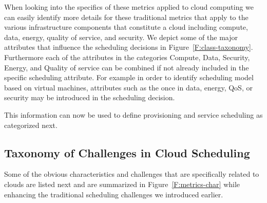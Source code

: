 \documentclass[final,5p,times,twocolumn]{elsarticle}
\begin{document}
% 

When looking into the specifics of these metrics applied to cloud
computing we can easily identify more details for these traditional
metrics that apply to the various infrastructure components that
constitute a cloud including compute, data, energy, quality of
service, and security. We depict some of the major attributes that
influence the scheduling decisions in Figure~\ref{F:class-taxonomy}.
Furthermore each of the attributes in the categories Compute, Data,
Security, Energy, and Quality of service can be combined if not
already included in the specific scheduling attribute. For example in
order to identify scheduling model based on virtual machines,
attributes such as the once in data, energy, QoS, or security may be
introduced in the scheduling decision.



This information can now be used to define provisioning and service
scheduling as categorized next.

\subsection{Taxonomy of Challenges in Cloud Scheduling}\label{sec:challange}

Some of the obvious characteristics and challenges that are
specifically related to clouds are listed next and are summarized in
Figure~\ref{F:metrics-char} while enhancing the traditional scheduling
challenges we introduced earlier.
\end{document}

